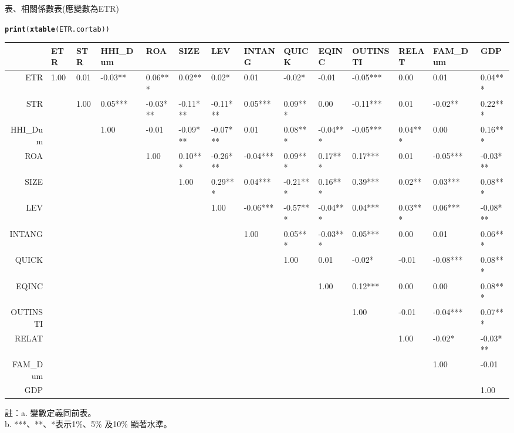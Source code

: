 \documentclass[a4paper]{article}\usepackage[]{graphicx}\usepackage[]{color}
\makeatletter
\newcommand{\hlstd}[1]{\textcolor[rgb]{0.345,0.345,0.345}{#1}}%
\newcommand{\hlkwd}[1]{\textcolor[rgb]{0.737,0.353,0.396}{\textbf{#1}}}%
\newenvironment{kframe}{%
 \def\at@end@of@kframe{}%
 \ifinner\ifhmode%
  \def\at@end@of@kframe{\end{minipage}}%
  \begin{minipage}{\columnwidth}%
 \fi\fi%
 \def\FrameCommand##1{\hskip\@totalleftmargin \hskip-\fboxsep
 \colorbox{shadecolor}{##1}\hskip-\fboxsep
     \hskip-\linewidth \hskip-\@totalleftmargin \hskip\columnwidth}%
 \MakeFramed {\advance\hsize-\width
   \@totalleftmargin\z@ \linewidth\hsize
   \@setminipage}}%
 {\par\unskip\endMakeFramed%
 \at@end@of@kframe}
\makeatother
\begin{document}
\newpage
\begin{landscape}
\thispagestyle{empty}
\centerline{表、相關係數表(應變數為ETR)}
\begin{kframe}
\begin{alltt}
\hlkwd{print}\hlstd{(}\hlkwd{xtable}\hlstd{(ETR.cortab))}
\end{alltt}
\end{kframe}%
\begin{table}[ht]
\centering
\begin{tabular}{rlllllllllllll}
  \hline
 & ETR & STR & HHI\_Dum & ROA & SIZE & LEV & INTANG & QUICK & EQINC & OUTINSTI & RELAT & FAM\_Dum & GDP \\ 
  \hline
ETR &  1.00  &  0.01    & -0.03**  &  0.06*** &  0.02**  &  0.02*   &  0.01    & -0.02*   & -0.01    & -0.05*** &  0.00    &  0.01    &  0.04*** \\ 
  STR &  &  1.00  &  0.05*** & -0.03*** & -0.11*** & -0.11*** &  0.05*** &  0.09*** &  0.00    & -0.11*** &  0.01    & -0.02**  &  0.22*** \\ 
  HHI\_Dum &  &  &  1.00  & -0.01    & -0.09*** & -0.07*** &  0.01    &  0.08*** & -0.04*** & -0.05*** &  0.04*** &  0.00    &  0.16*** \\ 
  ROA &  &  &  &  1.00  &  0.10*** & -0.26*** & -0.04*** &  0.09*** &  0.17*** &  0.17*** &  0.01    & -0.05*** & -0.03*** \\ 
  SIZE &  &  &  &  &  1.00  &  0.29*** &  0.04*** & -0.21*** &  0.16*** &  0.39*** &  0.02**  &  0.03*** &  0.08*** \\ 
  LEV &  &  &  &  &  &  1.00  & -0.06*** & -0.57*** & -0.04*** &  0.04*** &  0.03*** &  0.06*** & -0.08*** \\ 
  INTANG &  &  &  &  &  &  &  1.00  &  0.05*** & -0.03*** &  0.05*** &  0.00    &  0.01    &  0.06*** \\ 
  QUICK &  &  &  &  &  &  &  &  1.00  &  0.01    & -0.02*   & -0.01    & -0.08*** &  0.08*** \\ 
  EQINC &  &  &  &  &  &  &  &  &  1.00  &  0.12*** &  0.00    &  0.00    &  0.08*** \\ 
  OUTINSTI &  &  &  &  &  &  &  &  &  &  1.00  & -0.01    & -0.04*** &  0.07*** \\ 
  RELAT &  &  &  &  &  &  &  &  &  &  &  1.00  & -0.02*   & -0.03*** \\ 
  FAM\_Dum &  &  &  &  &  &  &  &  &  &  &  &  1.00  & -0.01    \\ 
  GDP &  &  &  &  &  &  &  &  &  &  &  &  &  1.00  \\ 
   \hline
\end{tabular}
\end{table}

註：a. 變數定義同前表。\\
    b. ***、**、*表示1\%、5\% 及10\% 顯著水準。\\
\end{landscape}
\end{document}
